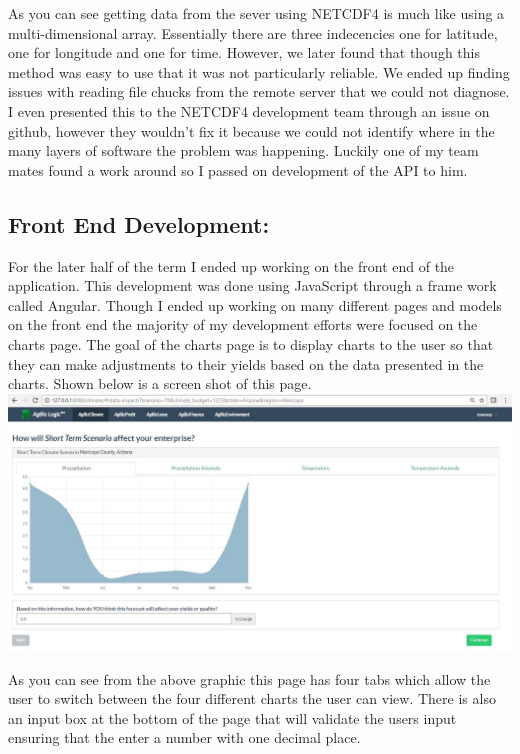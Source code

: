 \documentclass[onecolumn, draftclsnofoot,10pt, compsoc]{article}
\begin{document}
		As you can see getting data from the sever using NETCDF4 is much like using a multi-dimensional array. Essentially there are three indecencies one for latitude, one for longitude and one for time. However, we later found that though this method was easy to use that it was not particularly reliable. We ended up finding issues with reading file chucks from the remote server that we could not diagnose. I even presented this to the NETCDF4 development team through an issue on github, however they wouldn't fix it because we could not identify where in the many layers of software the problem was happening. Luckily one of my team mates found a work around so I passed on development of the API to him.\\
	
		\subsection{Front End Development:}
		For the later half of the term I ended up working on the front end of the application. This development was done using JavaScript through a frame work called Angular. Though I ended up working on many different pages and models on the front end the majority of my development efforts were focused on the charts page. The goal of the charts page is to display charts to the user so that they can make adjustments to their yields based on the data presented in the charts. Shown below is a screen shot of this page.\\
		
		\includegraphics[width=\paperwidth,scale=0.75]{Images/ChartsPage.JPG}
		
	As you can see from the above graphic this page has four tabs which allow the user to switch between the four different charts the user can view. There is also an input box at the bottom of the page that will validate the users input ensuring that the enter a number with one decimal place.\\
	
\end{document}

